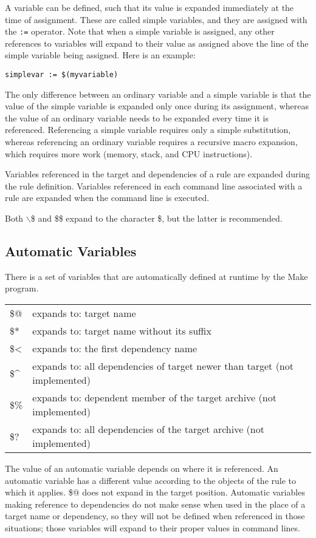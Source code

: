 A variable can be defined, such that its value is expanded immediately at
the time of assignment.  These are called simple variables, and they are
assigned with the {\tt :=} operator.  Note that when a simple variable is
assigned, any other references to variables will expand to their value as
assigned above the line of the simple variable being assigned.  Here is an
example:

\begin{verbatim}
simplevar := $(myvariable)
\end{verbatim}

The only difference between an ordinary variable and a simple variable is
that the value of the simple variable is expanded only once during its
assignment, whereas the value of an ordinary variable needs to be expanded
every time it is referenced.  Referencing a simple variable requires only a
simple substitution, whereas referencing an ordinary variable requires a
recursive macro expansion, which requires more work (memory, stack, and CPU
instructions).

Variables referenced in the target and dependencies of a rule are expanded
during the rule definition.  Variables referenced in each command line
associated with a rule are expanded when the command line is executed.

Both $\backslash$\$ and \$\$ expand to the character \$, but the latter is
recommended.


\subsection{Automatic Variables}

There is a set of variables that are automatically defined at runtime by
the Make program.


\begin{tabular}{ll}
\$@		& expands to: target name \\
\$*		& expands to: target name without its suffix \\
\$<		& expands to: the first dependency name \\
\$\^	& expands to: all dependencies of target newer than target
	(not implemented) \\
\$\%	& expands to: dependent member of the target archive (not implemented) \\
\$?		& expands to: all dependencies of the target archive (not implemented)
\end{tabular}


The value of an automatic variable depends on where it is referenced.  An
automatic variable has a different value according to the objects of the
rule to which it applies.  \$@ does not expand in the target position.
Automatic variables making reference to dependencies do not make sense when
used in the place of a target name or dependency, so they will not be
defined when referenced in those situations; those variables will expand to
their proper values in command lines.

